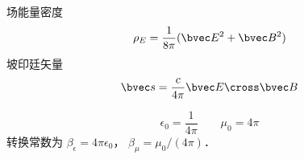 场能量密度 %
\begin{equation}
\rho_E = \frac{1}{8\pi} (\bvec E^2 + \bvec B^2)
\end{equation}
坡印廷矢量
\begin{equation}
\bvec s = \frac{c}{4\pi} \bvec E \cross \bvec B
\end{equation}

\begin{equation}
\epsilon_0 = \frac{1}{4\pi} \qquad
\mu_0 = 4\pi
\end{equation}
转换常数为 $\beta_\epsilon = 4\pi\epsilon_0$， $\beta_\mu = \mu_0/(4\pi)$．
